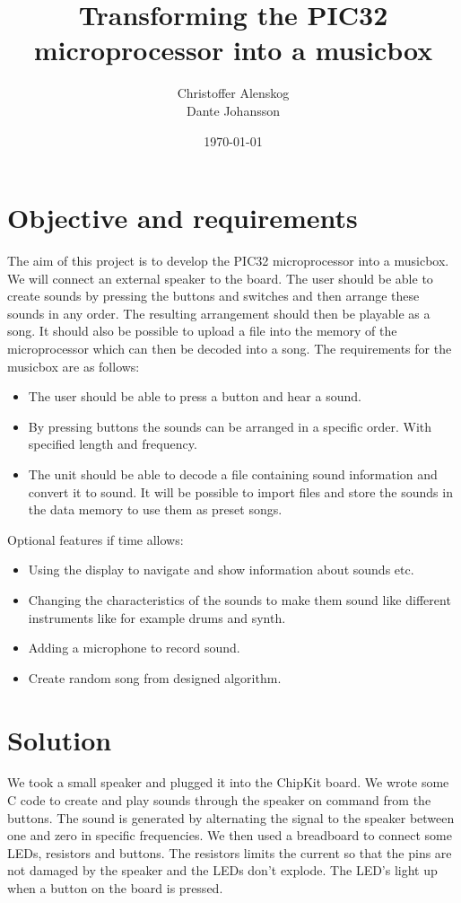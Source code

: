 \documentclass[a4paper]{article}
\title{Transforming the PIC32 microprocessor into a musicbox}
\author{Christoffer Alenskog \\ Dante Johansson}
\date{\today}
\begin{document}
\maketitle

\section{Objective and requirements}

The aim of this project is to develop the PIC32 microprocessor into a musicbox. We will connect an external speaker to the board. The user should be able to create sounds by pressing the buttons and switches and then arrange these sounds in any order. The resulting arrangement should then be playable as a song. It should also be possible to upload a file into the memory of the microprocessor which can then be decoded into a song. The requirements for the musicbox are as follows:
\begin{itemize}
	\item The user should be able to press a button and hear a sound.
	\item By pressing buttons the sounds can be arranged in a specific order. With specified length and frequency.
	\item The unit should be able to decode a file containing sound information and convert it to sound. It will be possible to import files and store the sounds in the data memory to use them as preset songs.
\end{itemize}
Optional features if time allows:
\begin{itemize}
	\item Using the display to navigate and show information about sounds etc.
	\item Changing the characteristics of the sounds to make them sound like different instruments like for example drums and synth.
	\item Adding a microphone to record sound.
	\item Create random song from designed algorithm.
\end{itemize}

\section{Solution}

We took a small speaker and plugged it into the ChipKit board. We wrote some C code to create and play sounds through the speaker on command from the buttons. The sound is generated by alternating the signal to the speaker between one and zero in specific frequencies. We then used a  breadboard to connect some LEDs, resistors and buttons. The resistors limits the current so that the pins are not damaged by the speaker and the LEDs don't explode. The LED's light up when a button on the board is pressed. \\
\end{document}
